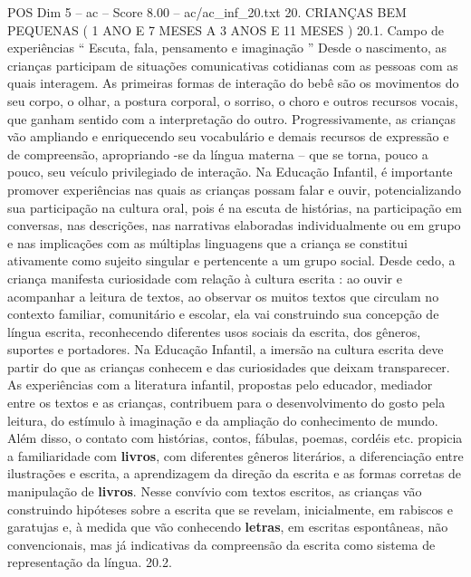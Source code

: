 \begin{textsample}{POS Dim 5 – ac – Score 8.00 – ac/ac\_inf\_20.txt}  \label{ex:f5_pos_123}
20.
CRIANÇAS BEM PEQUENAS ( 1 ANO E 7 MESES A 3 ANOS E 11 MESES ) 20.1.
Campo de experiências “ Escuta, fala, pensamento e imaginação ” Desde o nascimento, as crianças participam de situações comunicativas cotidianas com as pessoas com as quais interagem.
As primeiras formas de interação do bebê são os movimentos do seu corpo, o olhar, a postura corporal, o sorriso, o choro e outros recursos vocais, que ganham sentido com a interpretação do outro.
Progressivamente, as crianças vão ampliando e enriquecendo seu vocabulário e demais recursos de expressão e de compreensão, apropriando -se da língua materna – que se torna, pouco a pouco, seu veículo privilegiado de interação.
Na Educação Infantil, é importante promover experiências nas quais as crianças possam falar e ouvir, potencializando sua participação na cultura oral, pois é na escuta de histórias, na participação em conversas, nas descrições, nas narrativas elaboradas individualmente ou em grupo e nas implicações com as múltiplas linguagens que a criança se constitui ativamente como sujeito singular e pertencente a um grupo social.
Desde cedo, a criança manifesta curiosidade com relação à cultura escrita : ao ouvir e acompanhar a leitura de textos, ao observar os muitos textos que circulam no contexto familiar, comunitário e escolar, ela vai construindo sua concepção de língua escrita, reconhecendo diferentes usos sociais da escrita, dos gêneros, suportes e portadores.
Na Educação Infantil, a imersão na cultura escrita deve partir do que as crianças conhecem e das curiosidades que deixam transparecer.
As experiências com a literatura infantil, propostas pelo educador, mediador entre os textos e as crianças, contribuem para o desenvolvimento do gosto pela leitura, do estímulo à imaginação e da ampliação do conhecimento de mundo.
Além disso, o contato com histórias, contos, fábulas, poemas, cordéis etc. propicia a familiaridade com \textbf{livros}, com diferentes gêneros literários, a diferenciação entre ilustrações e escrita, a aprendizagem da direção da escrita e as formas corretas de manipulação de \textbf{livros}.
Nesse convívio com textos escritos, as crianças vão construindo hipóteses sobre a escrita que se revelam, inicialmente, em rabiscos e garatujas e, à medida que vão conhecendo \textbf{letras}, em escritas espontâneas, não convencionais, mas já indicativas da compreensão da escrita como sistema de representação da língua. 20.2.

\end{textsample}

